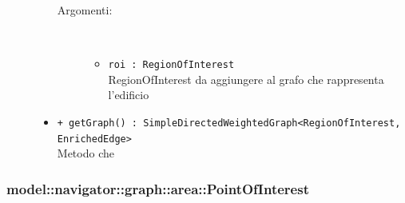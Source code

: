 \documentclass[../DefinizioneDiProdotto.tex]{subfiles}
\begin{document}
\begin{description}
\begin{itemize}
\begin{description}
\item[Argomenti:] \
\begin{itemize}
\item \texttt{roi : RegionOfInterest}\\
RegionOfInterest da aggiungere al grafo che rappresenta l'edificio\end{itemize}
\end{description}
\item \texttt{+ getGraph() : SimpleDirectedWeightedGraph<RegionOfInterest,\\EnrichedEdge>}\\
Metodo che
 \end{itemize}
\end{description}

\subsubsection{model::navigator::graph::area::PointOfInterest}
\end{document}
